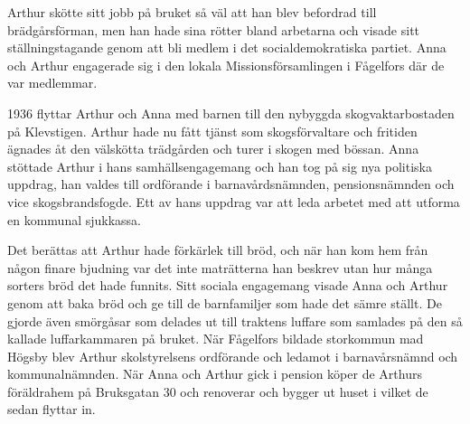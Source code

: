 Arthur skötte sitt jobb på bruket så väl att han blev befordrad till brädgårsförman, men han hade sina rötter bland arbetarna och visade sitt ställningstagande genom att bli medlem i det socialdemokratiska partiet.
Anna och Arthur engagerade sig i den lokala Missionsförsamlingen i Fågelfors där de var medlemmar.

1936 flyttar Arthur och Anna med barnen till den nybyggda skogvaktarbostaden på Klevstigen. Arthur hade nu fått tjänst som skogsförvaltare och fritiden ägnades åt den välskötta trädgården och turer i skogen med bössan.
Anna stöttade Arthur i hans samhällsengagemang och han tog på sig nya politiska uppdrag, han valdes till ordförande i barnavårdsnämnden, pensionsnämnden och vice skogsbrandsfogde.
Ett av hans uppdrag var att leda arbetet med att utforma en kommunal sjukkassa.

Det berättas att Arthur hade förkärlek till bröd, och när han kom hem från någon finare bjudning var det inte maträtterna han beskrev utan hur många sorters bröd det hade funnits. Sitt sociala engagemang visade Anna och Arthur genom att baka bröd och ge till de barnfamiljer som hade det sämre ställt. De gjorde även smörgåsar som delades ut till traktens luffare som samlades på den så kallade luffarkammaren på bruket.
När Fågelfors bildade storkommun mad Högsby blev Arthur skolstyrelsens ordförande och ledamot i barnavårsnämnd och kommunalnämnden.
När Anna och Arthur gick i pension köper de Arthurs föräldrahem på Bruksgatan 30 och renoverar och bygger ut huset i vilket de sedan flyttar in.

